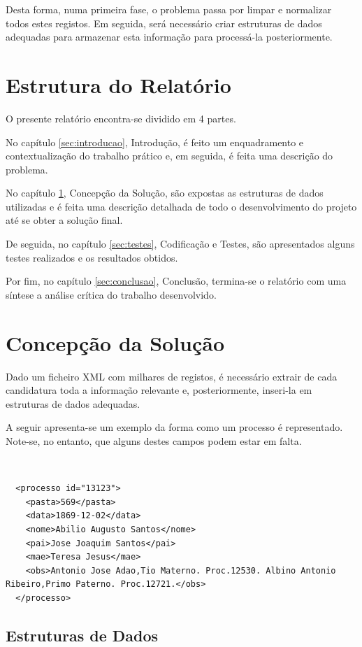 \documentclass[a4paper, 11pt]{article}
\begin{document}
Desta forma, numa primeira fase, o problema passa por limpar e normalizar todos estes registos. Em
seguida,  será  necessário criar estruturas de dados adequadas para armazenar esta informação para
processá-la posteriormente.

\section*{Estrutura do Relatório}

O presente relatório encontra-se dividido em 4 partes.

No capítulo \ref{sec:introducao}, Introdução, é feito um enquadramento e contextualização do trabalho
prático e, em
seguida, é feita uma descrição do problema. 

No capítulo \ref{sec:solucao}, Concepção da Solução, são expostas as estruturas de dados utilizadas
e é feita uma descrição detalhada de todo o desenvolvimento do projeto até se obter a solução final.

De seguida, no capítulo \ref{sec:testes}, Codificação e Testes, são apresentados alguns testes
realizados e os resultados obtidos.

Por fim, no capítulo \ref{sec:conclusao}, Conclusão, termina-se o relatório com uma síntese a análise
crítica do trabalho desenvolvido.

\pagebreak

\section{Concepção da Solução}
\label{sec:solucao}

Dado um ficheiro XML com milhares de registos, é necessário extrair de cada candidatura toda a informação
relevante e, posteriormente, inseri-la em estruturas de dados adequadas.

A seguir apresenta-se um exemplo da forma como um processo é representado. Note-se, no entanto, que
alguns destes campos podem estar em falta.

\

\begin{lstlisting}
  <processo id="13123">
    <pasta>569</pasta>
    <data>1869-12-02</data>
    <nome>Abilio Augusto Santos</nome>
    <pai>Jose Joaquim Santos</pai>
    <mae>Teresa Jesus</mae>
    <obs>Antonio Jose Adao,Tio Materno. Proc.12530. Albino Antonio Ribeiro,Primo Paterno. Proc.12721.</obs>
  </processo>
\end{lstlisting}

\subsection{Estruturas de Dados}
\end{document}
